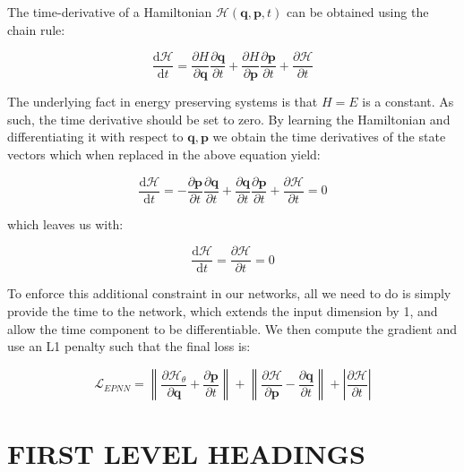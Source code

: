 \documentclass[twoside]{article}
\begin{document}
The time-derivative of a Hamiltonian $\mathcal{H}(\mathbf{q},\mathbf{p},t)$ can be obtained using the chain rule:

\begin{equation}
\frac{\mathrm{d}\mathcal{H}}{\mathrm{d}t} = \frac{\partial H}{\partial \mathbf{q}} \frac{\partial \mathbf{q}}{\partial t} + \frac{\partial H}{\partial \mathbf{p}} \frac{\partial \mathbf{p}}{\partial t} + \frac{\partial \mathcal{H}}{\partial t}
\end{equation}

The underlying fact in energy preserving systems is that $H = E$ is a constant. As such, the time derivative should be set to zero. By learning the Hamiltonian and differentiating it with respect to $\mathbf{q},\mathbf{p}$ we obtain the time derivatives of the state vectors which when replaced in the above equation yield:

\begin{equation}
\frac{\mathrm{d}\mathcal{H}}{\mathrm{d}t} = -\frac{\partial \mathbf{p}}{\partial t} \frac{\partial \mathbf{q}}{\partial t} + \frac{\partial \mathbf{q} }{\partial t} \frac{\partial \mathbf{p}}{\partial t} + \frac{\partial \mathcal{H}}{\partial t} = 0
\end{equation}

which leaves us with:

\begin{equation}
\frac{\mathrm{d}\mathcal{H}}{\mathrm{d}t} =  \frac{\partial \mathcal{H}}{\partial t} = 0
\end{equation}


To enforce this additional constraint in our networks, all we need to do is simply provide the time to the network, which extends the input dimension by 1, and allow the time component to be differentiable. We then compute the gradient and use an L1 penalty such that the final loss is:

\begin{equation}
\mathcal{L}_{EPNN} =\left\| \frac{\partial \mathcal{H_{\theta}}}{\partial \mathbf{q}} +  \frac{\partial \mathbf{p}}{\partial t} \right\| +\left\| \frac{\partial \mathcal{H} }{\partial \mathbf{p}} -  \frac{\partial \mathbf{q}}{\partial t} \right\|+ | \frac{\partial \mathcal{H}}{\partial t}|
\end{equation}

\section{FIRST LEVEL HEADINGS}
\end{document}

